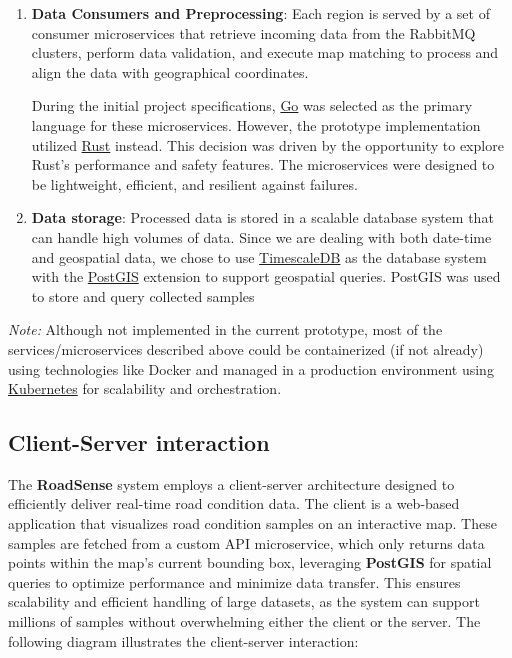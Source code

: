 \begin{enumerate}
	\item \textbf{Data Consumers and Preprocessing}: Each region is served by a set of consumer microservices that retrieve incoming data from the RabbitMQ clusters, perform data validation, and execute map matching to process and align the data with geographical coordinates.

	      During the initial project specifications, \href{https://golang.org/}{Go} was selected as the primary language for these microservices. However, the prototype implementation utilized \href{https://rust-lang.org/}{Rust} instead. This decision was driven by the opportunity to explore Rust's performance and safety features. The microservices were designed to be lightweight, efficient, and resilient against failures.

	\item \textbf{Data storage}: Processed data is stored in a scalable database system that can handle high volumes of data. Since we are dealing with both date-time and geospatial data, we chose to use \href{https://www.timescale.com/}{TimescaleDB} as the database system with the \href{https://postgis.net/}{PostGIS} extension to support geospatial queries.
	      PostGIS was used to store and query collected samples
\end{enumerate}

\noindent \textit{Note:} Although not implemented in the current prototype, most of the services/microservices described above could be containerized (if not already) using technologies like Docker and managed in a production environment using \href{https://kubernetes.io/}{Kubernetes} for scalability and orchestration.

\subsection{Client-Server interaction}
\label{subsec:client_server_interaction}

The \textbf{RoadSense} system employs a client-server architecture designed to efficiently deliver real-time road condition data. The client is a web-based application that visualizes road condition samples on an interactive map. These samples are fetched from a custom API microservice, which only returns data points within the map's current bounding box, leveraging \textbf{PostGIS} for spatial queries to optimize performance and minimize data transfer. This ensures scalability and efficient handling of large datasets, as the system can support millions of samples without overwhelming either the client or the server. The following diagram illustrates the client-server interaction:

